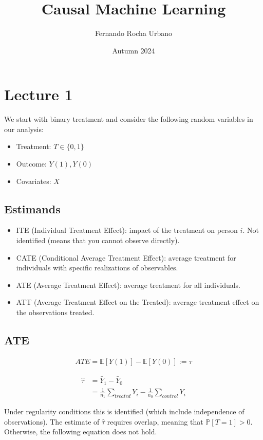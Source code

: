 \documentclass{article}
\title{Causal Machine Learning}
\author{Fernando Rocha Urbano}
\date{Autumn 2024}
\begin{document}
\maketitle

\section{Lecture 1}
We start with binary treatment and consider the following random variables in our analysis:

\begin{itemize}
    \item Treatment: $T \in \{0, 1\}$
    \item Outcome: $Y(1), Y(0)$
    \item Covariates: $X$
\end{itemize}

\subsection{Estimands}
\begin{itemize}
    \item ITE (Individual Treatment Effect): impact of the treatment on person $i$. Not identified (means that you cannot observe directly).
    \item CATE (Conditional Average Treatment Effect): average treatment for individuals with specific realizations of observables.
    \item ATE (Average Treatment Effect): average treatment for all individuals.
    \item ATT (Average Treatment Effect on the Treated): average treatment effect on the observations treated.
\end{itemize}

\subsection{ATE}

\begin{align*}
    ATE = \mathbb{E}[Y(1)] - \mathbb{E}[Y(0)] := \tau
\end{align*}

\begin{align*}
    \hat{\tau} &= \bar{Y}_1 - \bar{Y}_0 \\
               &= \frac{1}{n_1} \sum_{treated} Y_i - \frac{1}{n_0} \sum_{control} Y_i
\end{align*}

Under regularity conditions this is identified (which include independence of observations). The estimate of $\hat{\tau}$ requires overlap, meaning that $\mathbb{P}[T = 1] > 0$. Otherwise, the following equation does not hold.
\end{document}
